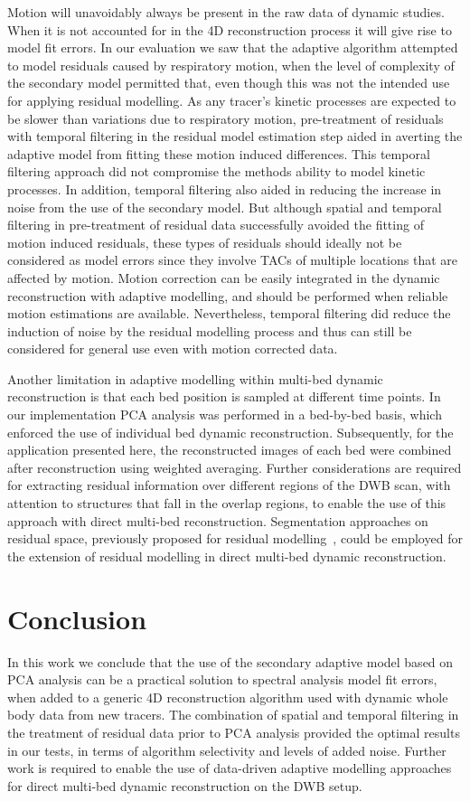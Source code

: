 Motion will unavoidably always be present in the raw data of dynamic studies. When it is not accounted for in the 4D reconstruction process it will give rise to model fit errors. In our evaluation we saw that the adaptive algorithm attempted to model residuals caused by respiratory motion, when the level of complexity of the secondary model permitted that, even though this was not the intended use for applying residual modelling.
As any tracer's kinetic processes are expected to be slower than variations due to respiratory motion, pre-treatment of residuals with temporal filtering in the residual model estimation step aided in averting the adaptive model from fitting these motion induced differences. This temporal filtering approach did not compromise the methods ability to model kinetic processes. In addition, temporal filtering also aided in reducing the increase in noise from the use of the secondary model.
But although spatial and temporal filtering in pre-treatment of residual data successfully avoided the fitting of motion induced residuals, these types of residuals should ideally not be considered as model errors since they involve TACs of multiple locations that are affected by motion. Motion correction can be easily integrated in the dynamic reconstruction with adaptive modelling, and should be performed when reliable motion estimations are available. Nevertheless, temporal filtering did reduce the induction of noise by the residual modelling process and thus can still be considered for general use even with motion corrected data.

Another limitation in adaptive modelling within multi-bed dynamic reconstruction is that each bed position is sampled at different time points. In our implementation PCA analysis was performed in a bed-by-bed basis, which enforced the use of individual bed dynamic reconstruction. Subsequently, for the application presented here, the reconstructed images of each bed were combined after reconstruction using weighted averaging. Further considerations are required for extracting residual information over different regions of the DWB scan, with attention to structures that fall in the overlap regions, to enable the use of this approach with direct multi-bed reconstruction. Segmentation approaches on residual space, previously proposed for residual modelling~\cite{Germino2016}, could be employed for the extension of residual modelling in direct multi-bed dynamic reconstruction.

\section{Conclusion}
In this work we conclude that the use of the secondary adaptive model based on PCA analysis can be a practical solution to spectral analysis model fit errors, when added to a generic 4D reconstruction algorithm used with dynamic whole body data from new tracers. The combination of spatial and temporal filtering in the treatment of residual data prior to PCA analysis provided the optimal results in our tests, in terms of algorithm selectivity and levels of added noise. 
Further work is required to enable the use of data-driven adaptive modelling approaches for direct multi-bed dynamic reconstruction on the DWB setup. 